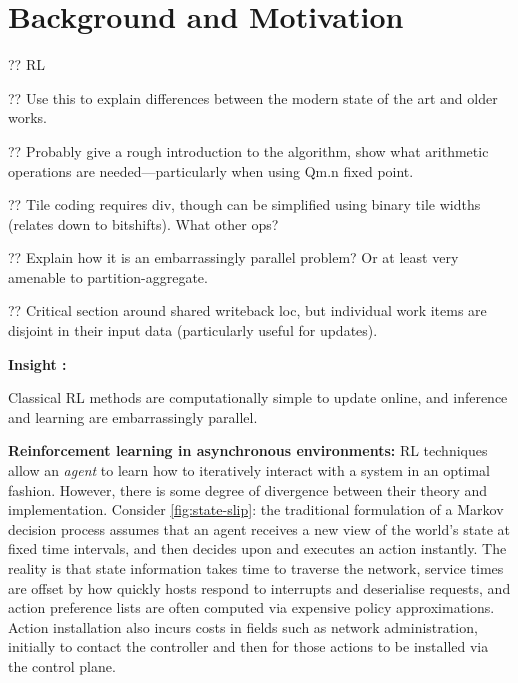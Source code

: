 \documentclass[sigconf,natbib=false]{acmart}
\newcommand{\fakepara}[1]{\noindent\textbf{#1:}}
\newcounter{insightc}
\newenvironment{insight}
	{
		\begin{tipblock}\refstepcounter{insightc}\textbf{Insight \theinsightc:}\em
	}
	{
		\end{tipblock}
	}
\begin{document}
\section{Background and Motivation}\label{sec:motivation}
?? RL~\parencite{RL2E}

?? Use this to explain differences between the modern state of the art and older works.

?? Probably give a rough introduction to the algorithm, show what arithmetic operations are needed---particularly when using Qm.n fixed point.

?? Tile coding requires div, though can be simplified using binary tile widths (relates down to bitshifts). What other ops?

?? Explain how it is an embarrassingly parallel problem? Or at least very amenable to partition-aggregate.

?? Critical section around shared writeback loc, but individual work items are disjoint in their input data (particularly useful for updates).

\begin{insight}
	Classical RL methods are computationally simple to update online, and inference and learning are embarrassingly parallel.
\end{insight}

\fakepara{Reinforcement learning in asynchronous environments}
RL techniques allow an \emph{agent} to learn how to iteratively interact with a system in an optimal fashion.
However, there is some degree of divergence between their theory and implementation.
Consider \cref{fig:state-slip}: the traditional formulation of a Markov decision process assumes that an agent receives a new view of the world's state at fixed time intervals, and then decides upon and executes an action instantly.
The reality is that state information takes time to traverse the network, service times are offset by how quickly hosts respond to interrupts and deserialise requests, and action preference lists are often computed via expensive policy approximations.
Action installation also incurs costs in fields such as network administration, initially to contact the controller and then for those actions to be installed via the control plane.
\end{document}
